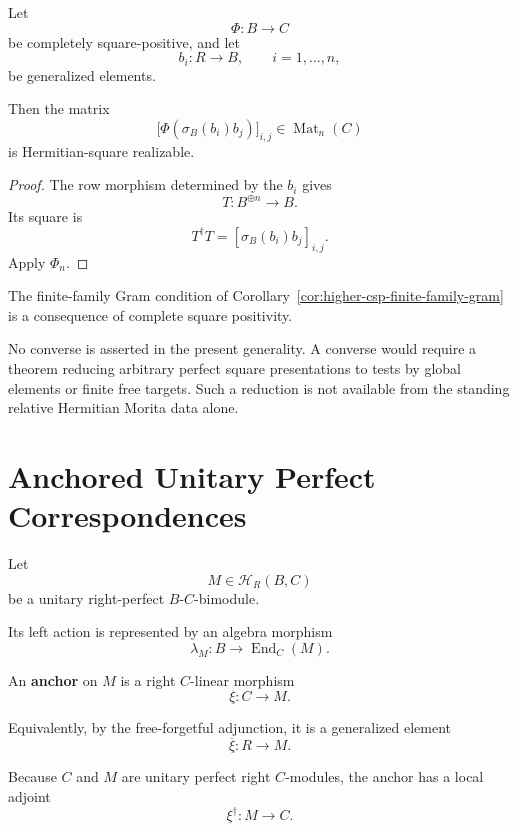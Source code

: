 \begin{corollary}
\label{cor:higher-csp-finite-family-gram}
Let
\[
  \Phi:B\to C
\]
be completely square-positive, and let
\[
  b_i:R\to B,
  \qquad
  i=1,\ldots,n,
\]
be generalized elements.

Then the matrix
\[
  \bigl[
    \Phi(\sigma_B(b_i)b_j)
  \bigr]_{i,j}
  \in
  \operatorname{Mat}_n(C)
\]
is Hermitian-square realizable.
\end{corollary}

\begin{proof}
The row morphism determined by the \(b_i\) gives
\[
  T:B^{\oplus n}\to B.
\]
Its square is
\[
  T^\dagger T
  =
  [\sigma_B(b_i)b_j]_{i,j}.
\]
Apply \(\Phi_n\).
\end{proof}

\begin{remark}
\label{rem:higher-no-gram-converse}
The finite-family Gram condition of
Corollary~\ref{cor:higher-csp-finite-family-gram} is a consequence of complete
square positivity.

No converse is asserted in the present generality. A converse would require
a theorem reducing arbitrary perfect square presentations to tests by global
elements or finite free targets. Such a reduction is not available from the
standing relative Hermitian Morita data alone.
\end{remark}

\section{Anchored Unitary Perfect Correspondences}
\label{sec:higher-anchored-correspondences}

Let
\[
  M\in\mathcal H_R(B,C)
\]
be a unitary right-perfect \(B\)-\(C\)-bimodule.

Its left action is represented by an algebra morphism
\[
  \lambda_M:
  B
  \longrightarrow
  \operatorname{End}_C(M).
\]

\begin{definition}[Anchor]
\label{def:higher-anchor}
An \textbf{anchor} on \(M\) is a right \(C\)-linear morphism
\[
  \xi:C\to M.
\]

Equivalently, by the free-forgetful adjunction, it is a generalized element
\[
  \overline\xi:R\to M.
\]
\end{definition}

Because \(C\) and \(M\) are unitary perfect right \(C\)-modules, the anchor has
a local adjoint
\[
  \xi^\dagger:M\to C.
\]

